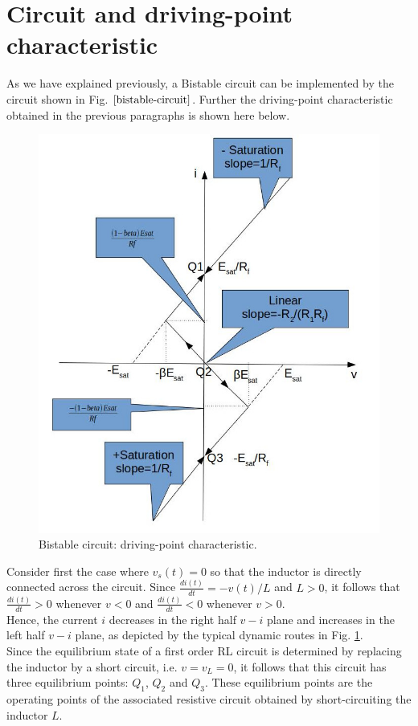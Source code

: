 \documentclass[12pt,a4paper,tweside,onehalfspacing]{article}
\begin{document}
\section{Circuit and driving-point characteristic}
As we have explained previously, a Bistable circuit can be implemented by the circuit shown in Fig. $\ref{bistable-circuit}$.
Further the driving-point characteristic obtained in the previous paragraphs is shown here below.
\begin{figure}[!ht]
        \centering \includegraphics[width=0.8\columnwidth]{driving-point-characteristic.jpg}\caption{\label{driving-point characteristic}Bistable circuit: driving-point characteristic.
        }
\end{figure}
Consider first the case where $v_s(t) = 0$ so that the inductor is directly connected across the circuit. Since $\frac{di(t)}{dt}=-v(t)/L$ and $L>0$, it follows that $\frac{di(t)}{dt}>0$ whenever $v < 0$ and $\frac{di(t)}{dt} < 0$ whenever $v>0$.\\
Hence, the current $i$ decreases in the right half $v-i$ plane and increases in the left half $v-i$ plane, as depicted by the typical dynamic routes in Fig. \ref{driving-point characteristic}.\\
Since the equilibrium state of a first order RL circuit is determined by replacing the inductor by a short circuit, i.e. $v=v_L=0$, it follows that this circuit has three equilibrium points: $Q_1$, $Q_2$ and $Q_3$. These equilibrium points are the operating points of the associated resistive circuit obtained by short-circuiting the inductor $L$.\\
\end{document}
